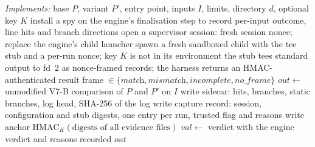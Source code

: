 \begin{algorithm}[!t]
\caption{Evidence acquisition and sealing}
\label{alg:acquire}
\small
\begin{algorithmic}[1]
\Statex \textit{Implements:} 
\Require base $P$, variant $P'$, entry point, inputs $I$, limits, directory $d$, optional key $K$
\State install a spy on the engine's finalisation step to record per-input outcome, line hits and branch directions
\State open a supervisor session: fresh session nonce; replace the engine's child launcher
  \State spawn a fresh sandboxed child with the tee stub and a per-run nonce; key $K$ is not in its environment
  \State the stub tees standard output to fd~2 as nonce-framed records; the harness returns an HMAC-authenticated result frame
  \State {} $\in\{\textit{match},\textit{mismatch},\textit{incomplete},\textit{no\_frame}\}$
\EndFor
\State $\mathit{out}\gets$ unmodified V7-B comparison of $P$ and $P'$ on $I$ 
\State write sidecar: hits, branches, static branches, log head, SHA-256 of the log
\State write capture record: session, configuration and stub digests, one entry per run, trusted flag and reasons
 write anchor $\mathrm{HMAC}_K(\text{digests of all evidence files})$ \EndIf
\State $\mathit{val}\gets$  
 \Return verdict \INS{} with the engine verdict and reasons recorded
\Else{} \Return $\mathit{out}$
\EndIf
\end{algorithmic}
\end{algorithm}

